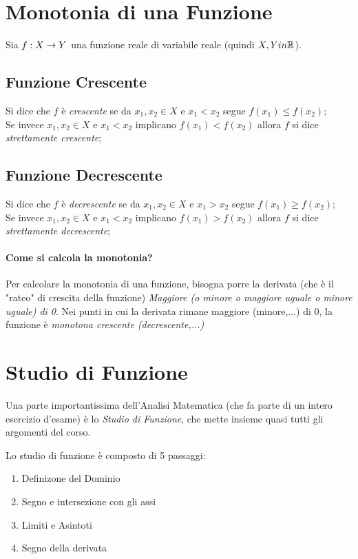 \documentclass[12pt, a4paper, openany]{book}
\begin{document}
\section{Monotonia di una Funzione}
Sia $f: X \rightarrow Y$ una funzione reale di variabile reale (quindi $X, Y in \mathbb{R}$).

\subsection*{Funzione Crescente}
Si dice che $f$ è \emph{crescente} se da $x_1, x_2 \in X$ e $x_1 < x_2$ segue $f(x_1) \leq f(x_2)$;
\\Se invece $x_1, x_2 \in X$ e $x_1 < x_2$ implicano $f(x_1) < f(x_2)$ allora $f$ si dice \emph{strettamente crescente};

\subsection*{Funzione Decrescente}
Si dice che $f$ è \emph{decrescente} se da $x_1, x_2 \in X$ e $x_1 > x_2$ segue $f(x_1) \geq f(x_2)$;
\\Se invece $x_1, x_2 \in X$ e $x_1 < x_2$ implicano $f(x_1) > f(x_2)$ allora $f$ si dice \emph{strettamente decrescente};

\paragraph{Come si calcola la monotonia?}
Per calcolare la monotonia di una funzione, bisogna porre la derivata (che è il "rateo" di crescita della funzione) \emph{Maggiore (o minore o maggiore uguale o minore uguale) di 0}.
Nei punti in cui la derivata rimane maggiore (minore,...) di 0, la funzione è \emph{monotona crescente (decrescente,...)}


\section{Studio di Funzione}
Una parte importantissima dell'Analisi Matematica (che fa parte di un intero esercizio d'esame) è lo \emph{Studio di Funzione},
che mette insieme quasi tutti gli argomenti del corso.

Lo studio di funzione è composto di 5 passaggi:
\begin{enumerate}
	\item Definizone del Dominio
 \item Segno e intersezione con gli assi
 \item Limiti e Asintoti
 \item Segno della derivata
\end{enumerate}
\end{document}
